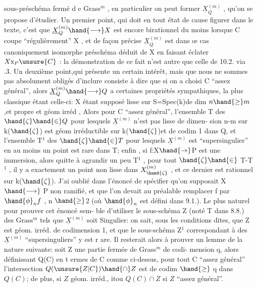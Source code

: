 
sous-préschéma fermé d e Grass$^{m}$ , en particulier on peut former $\underline{X}^{(m)}_{Q}$ ,
qu'on se propose d'étudier. Un premier point, qui doit en tout état de
cause figurer dans le texte, c'est que $\underline{X}^{(m)}_{Q} \hand{\longrightarrow} X$ est encore birationnel
du moins lorsque C coupe ``régulièrement'' X , et de façon précise $\underline{X}^{(m)}_{Q}$
est dans œ cas canoniquement isomorphe  préschéma déduit de X en
faisant éclater $X\mathrm{x}_{P}\unsure{C}$ : la démonstration de ce fait n'est autre que celle
de 10.2. via .3. Un deuxième point,qui présente un certain intérêt,
mais que nous ne sommes pas absolument obligés d'inclure consiste à
dire que si on a choisi C ``assez général'', alors $\underline{X}^{(m)}_{Q} \hand{\longrightarrow} Q$ a certaines
propriétés sympathiques, la plus classique étant celle-ci: X étant
supposé lisse sur S=Spec(k)de dim $n \hand{\geq} m$,et propre et géom irréd , Alors pour C ``assez
général'', l'ensemble T des $\hand{\zeta}\hand{\in} Q$ pour lesquels $\underline{X}^{(m)}$ n'est pas lisse de dimen-%
sion n-m sur k($\hand{\zeta}$) est géom irréductible sur k($\hand{\zeta}$)et de codim 1 dans Q, et 
l'ensemble T$^{1}$ des $\hand{\zeta}\hand{\in} T$ pour lesquels $\underline{X}^{(m)}$ est ``supersingulier'' en au
moins un point est rare dans T;
 enfin , si f:X$\hand{\rightarrow}$P est une immersion, alors
quitte à agrandir un peu T$^{1}$ , pour tout $\hand{\zeta}\hand{\in}$ T-T$^{1}$ , il y a exactement un
\placedmargin{$|$}point non lisse dans $X^{(m)}_{\hand{\zeta}}$ , et ce dernier est rationnel sur k($\hand{\zeta}$). J'ai
oublié dans l'énoncé de spécifier qu'on supposait X  $\hand{\longrightarrow}$ P non ramifié,
et que l'on devait au préalable remplacer f par $\hand{\phi}_{n}f$ , n $\hand{\geq}$2 (où $\hand{\phi}_{n}$ est
défini dans 9.1.). Le plus naturel  pour prouver cet énoncé sem-%
ble d'utiliser le sous-schéma Z (noté T dans 8.8.) des Grass$^{m}$ tels
que $\underline{X}^{(m)}$ soit Singulier: on sait, sous les conditions dites, que Z
est géom. irréd. de codimension 1, et que le sous-schéma Z$^{1}$ correspondant
à des $\underline{X}^{(m)}$ ``supersinguliers'' y est r are. Il resterait alors à prouver un
lemme de la nature suivante: soit Z une partie fermée de Grass$^{m}$ de codi-%
mension q, alors définissant Q(C) en t ermes de C comme ci-dessus, pour
tout C ``assez général'' l'intersection $Q(\unsure{Z|C})\hand{\cap} Z$ est de codim $\hand{\geq}$ q dans
$Q(C)$; de plus, si $Z$ géom. irréd., itou $Q(C)\cap Z$ si $Z$ ``assez général''.

